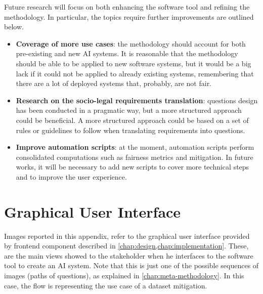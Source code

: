 \documentclass[12pt,a4paper,openright,twoside]{book}
\begin{document}
Future research will focus on both enhancing the software tool and refining the methodology.
%
In particular, the topics require further improvements are outlined below.

\begin{itemize}
    \item \textbf{Coverage of more use cases}: the methodology should account for both pre-existing and new \ac{AI} systems.
    It is reasonable that the methodology should be able to be applied to new software systems, but it would be a big lack if it could not be applied to already existing systems, remembering that there are a lot of deployed systems that, probably, are not fair.

    \item \textbf{Research on the socio-legal requirements translation}: questions design has been conducted in a pragmatic way, but a more structured approach could be beneficial.
    A more structured approach could be based on a set of rules or guidelines to follow when translating requirements into questions.

    \item \textbf{Improve automation scripts}: at the moment, automation scripts perform consolidated computations such as fairness metrics and mitigation.
    In future works, it will be necessary to add new scripts to cover more technical steps and to improve the user experience.
\end{itemize}


\appendix


\chapter{Graphical User Interface}\label{app:gui}

Images reported in this appendix, refer to the graphical user interface provided by frontend component described in \cref{chap:design,chap:implementation}.
%
These, are the main views showed to the stakeholder when he interfaces to the software tool to create an AI system.
%
Note that this is just one of the possible sequences of images (paths of questions), as explained in \cref{chap:meta-methodology}.
%
In this case, the flow is representing the use case of a dataset mitigation.
\end{document}
